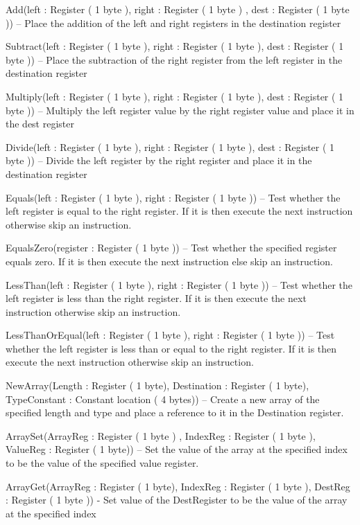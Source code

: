 \documentclass[]{final_report}
\begin{document}
Add(left : Register ( 1 byte ), right : Register ( 1 byte ) , dest : Register ( 1 byte )) – Place the
addition of the left and right registers in the destination register

Subtract(left : Register ( 1 byte ), right : Register ( 1 byte ), dest : Register ( 1 byte )) – Place the
subtraction of the right register from the left register in the destination register

Multiply(left : Register ( 1 byte ), right : Register ( 1 byte ), dest : Register ( 1 byte )) – Multiply
the left register value by the right register value and place it in the dest register

Divide(left : Register ( 1 byte ), right : Register ( 1 byte ), dest : Register ( 1 byte )) – Divide the
left register by the right register and place it in the destination register

Equals(left : Register ( 1 byte ), right : Register ( 1 byte )) – Test whether the left register is equal
to the right register. If it is then execute the next instruction otherwise skip an instruction.

EqualsZero(register : Register ( 1 byte )) – Test whether the specified register equals zero. If it is
then execute the next instruction else skip an instruction.

LessThan(left : Register ( 1 byte ), right : Register ( 1 byte )) – Test whether the left register is less
than the right register. If it is then execute the next instruction otherwise skip an instruction.

LessThanOrEqual(left : Register ( 1 byte ), right : Register ( 1 byte )) – Test whether the left
register is less than or equal to the right register. If it is then execute the next instruction otherwise
skip an instruction.

NewArray(Length : Register ( 1 byte), Destination : Register ( 1 byte), TypeConstant : Constant
location ( 4 bytes)) – Create a new array of the specified length and type and place a reference to it
in the Destination register.

ArraySet(ArrayReg : Register ( 1 byte ) , IndexReg : Register ( 1 byte ), ValueReg : Register ( 1
byte)) – Set the value of the array at the specified index to be the value of the specified value
register.

ArrayGet(ArrayReg : Register ( 1 byte), IndexReg : Register ( 1 byte ), DestReg : Register ( 1
byte )) - Set value of the DestRegister to be the value of the array at the specified index
\end{document}
